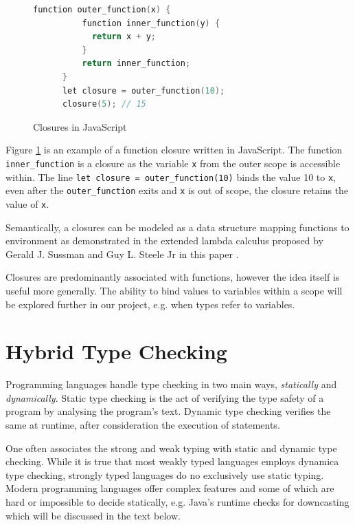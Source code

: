 \documentclass[a4paper,12pt]{report}
\begin{document}
\begin{figure}[H]
  \begin{center}
    \begin{lstlisting}[language=C]
      function outer_function(x) {
          function inner_function(y) {
            return x + y;
          }
          return inner_function;
      }
      let closure = outer_function(10);
      closure(5); // 15
    \end{lstlisting}    
  \end{center}
  \caption{Closures in JavaScript}
  \label{code:clousure_js}
\end{figure}

Figure \ref{code:clousure_js} is an example of a function closure written in 
JavaScript. The function \verb|inner_function| is a closure as the variable 
\verb|x| from the outer scope is accessible within. The line 
\verb|let closure = outer_function(10)| binds the value 10 to \verb|x|, even after the 
\verb|outer_function| exits and \verb|x| is out of scope, the closure retains 
the value of \verb|x|.

\par
Semantically, a closures can be modeled as a data structure mapping 
functions to environment as demonstrated in the extended lambda calculus proposed by 
Gerald J. Sussman and Guy L. Steele Jr in this paper \cite{closureLambdaOp}. 

\par
Closures are predominantly associated with functions, however the idea itself is 
useful more generally. The ability to bind values to variables within a scope will be explored 
further in our project, e.g. when types refer to variables. 

\section{Hybrid Type Checking} \label{section:hybrid_type_checking}
Programming languages handle type checking in two main ways, \textit{statically} 
and \textit{dynamically}. Static type checking is the act of verifying the type 
safety of a program by analysing the program's text. Dynamic type checking 
verifies the same at runtime, after consideration the execution of statements. 

\par
One often associates the strong and weak typing with static and dynamic type 
checking. While it is true that most weakly typed languages employs dynamica 
type checking, strongly typed languages do no exclusively use static typing. 
Modern programming languages offer complex features and some of which are hard 
or impossible to decide statically, e.g. Java's runtime checks for downcasting 
which will be discussed in the text below. 
\end{document}
